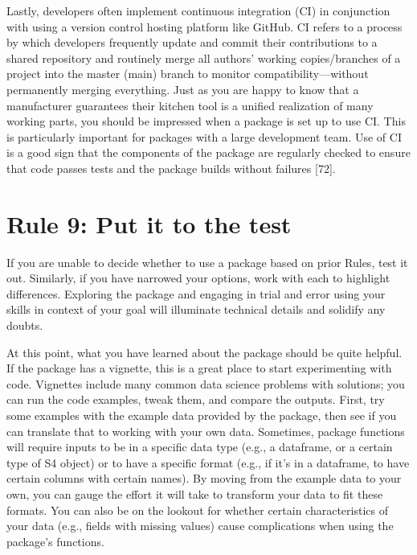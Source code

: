 \documentclass[10pt,letterpaper]{article}
\begin{document}
Lastly, developers often implement continuous integration (CI) in
conjunction with using a version control hosting platform like GitHub.
CI refers to a process by which developers frequently update and commit
their contributions to a shared repository and routinely merge all
authors' working copies/branches of a project into the master (main)
branch to monitor compatibility---without permanently merging
everything. Just as you are happy to know that a manufacturer guarantees
their kitchen tool is a unified realization of many working parts, you
should be impressed when a package is set up to use CI. This is
particularly important for packages with a large development team. Use
of CI is a good sign that the components of the package are regularly
checked to ensure that code passes tests and the package builds without
failures {[}72{]}.

\hypertarget{rule-9-put-it-to-the-test}{%
\section{Rule 9: Put it to the test}\label{rule-9-put-it-to-the-test}}

If you are unable to decide whether to use a package based on prior
Rules, test it out. Similarly, if you have narrowed your options, work
with each to highlight differences. Exploring the package and engaging
in trial and error using your skills in context of your goal will
illuminate technical details and solidify any doubts.

At this point, what you have learned about the package should be quite
helpful. If the package has a vignette, this is a great place to start
experimenting with code. Vignettes include many common data science
problems with solutions; you can run the code examples, tweak them, and
compare the outputs. First, try some examples with the example data
provided by the package, then see if you can translate that to working
with your own data. Sometimes, package functions will require inputs to
be in a specific data type (e.g., a dataframe, or a certain type of S4
object) or to have a specific format (e.g., if it's in a dataframe, to
have certain columns with certain names). By moving from the example
data to your own, you can gauge the effort it will take to transform
your data to fit these formats. You can also be on the lookout for
whether certain characteristics of your data (e.g., fields with missing
values) cause complications when using the package's functions.
\end{document}
